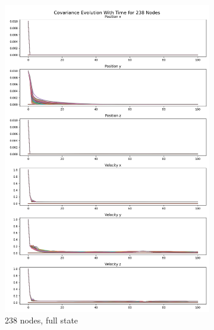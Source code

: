 \documentclass[subscriptcorrection,upint,varvw,barcolor=Goldenrod3,mathalfa=cal=euler,balance,hyphenate,french,pdf-a, nofoot]{asmejour} %
\begin{document}
\begin{figure}[ht]
    \centering
    \begin{subfigure}[b]{0.32\linewidth}
        \includegraphics[width=\linewidth]{CLOTH REPORT PICS/covariance 238.jpg}
        \caption{238 nodes, full state}
        \label{fig:covariance-238-full}
    \end{subfigure}
    \hfill %
    \begin{subfigure}[b]{0.32\linewidth}

\end{subfigure}
\end{figure}
\end{document}
